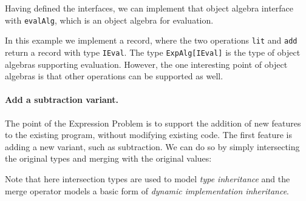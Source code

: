 Having defined the interfaces, we can implement that object algebra interface
with \lstinline$evalAlg$, which is an object algebra for evaluation.
\begin{comment}
  \begin{lstlisting}{language=F2J}
    let evalAlg: ExpAlg[IEval] = {
      lit = \(x: Int) -> {eval = x},
      add = \(x: IEval) (y: IEval) -> {
        eval = x.eval + y.eval
      }
    };
  \end{lstlisting}
\end{comment}

In this example we implement a record, where the two operations
\lstinline{lit} and \lstinline{add} return a record with type \lstinline{IEval}.
The type \lstinline$ExpAlg[IEval]$ is the type of object algebras
supporting evaluation. However, the one interesting point
of object algebras is that other operations can be supported as
well.

\paragraph{Add a subtraction variant.} The point of the Expression
Problem is to support the addition of new features to the existing
program, without modifying existing code.
The first feature is adding a new variant, such as subtraction. We can do so by
simply intersecting the original types and merging with the original values:

\begin{comment}
  \begin{lstlisting}{language=F2J}
    type SubExpAlg[E] =
    ExpAlg[E] & {sub: E -> E -> E};
    let subEvalAlg = evalAlg ,, {
      sub = \(x: IEval) (y: IEval) -> {
        eval = x.eval - y.eval
      }
    };
  \end{lstlisting}
\end{comment}


\noindent Note that here intersection types are used to model \emph{type
  inheritance} and the merge operator models a basic form of
\emph{dynamic implementation inheritance}.

